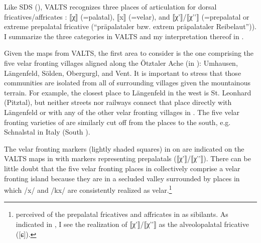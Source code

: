 Like SDS (), VALTS recognizes three places of articulation for dorsal fricatives/affricates \citep[74]{Gabriel1985}: ⟦χ⟧ (=palatal), ⟦x⟧ (=velar), and ⟦χ'⟧/⟦χ'{}'⟧ (=prepalatal or extreme prepalatal fricative (“präpalataler bzw. extrem präpala\-ta\-ler Reibelaut”)). I summarize the three categories in VALTS and my interpretation thereof in .\largerpage[2]

\begin{table}
\caption{\label{tab:15.4}VALTS symbols for dorsal fricatives and their probable interpretation}
\end{table}

Given the maps from VALTS, the first area to consider is the one comprising the five velar fronting villages aligned along the Ötztaler Ache (in ): Umhausen, Längenfeld, Sölden, Obergurgl, and Vent. It is important to stress that those communities are isolated from all of surrounding villages given the mountainous terrain. For example, the closest place to Längenfeld in the west is St. Leonhard (Pitztal), but neither streets nor railways connect that place directly with Längenfeld or with any of the other velar fronting villages in . The five velar fronting varieties of  are similarly cut off from the places to the south, e.g. Schnalstal in Italy (South ).

The velar fronting markers (lightly shaded squares) in  on  are indicated on the VALTS maps in  with markers representing prepalatals (⟦χ'⟧/⟦χ'{}'⟧). There can be little doubt that the five velar fronting places in  collectively comprise a velar fronting island because they are in a secluded valley surrounded by places in which /x/ and /kx/ are consistently realized as velar.\footnote{\citet[71]{Kranzmayer1956} perceived of the prepalatal fricatives and affricates in  as sibilants. As indicated in , I see the  realization of ⟦χ'⟧/⟦χ'{}'⟧ as the alveolopalatal fricative ([ɕ]).}

